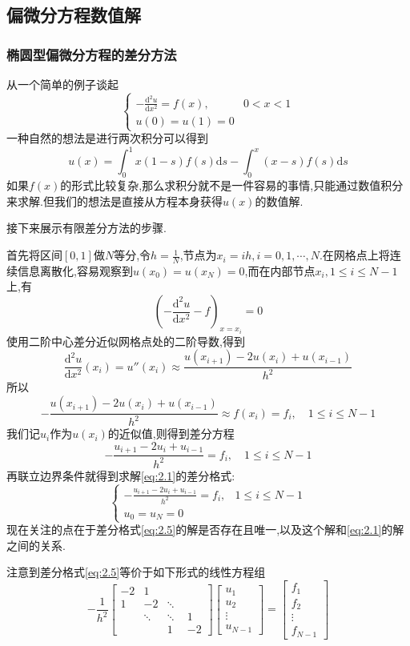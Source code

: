 \newpage
\subsection{偏微分方程数值解}
\subsubsection{椭圆型偏微分方程的差分方法}
从一个简单的例子谈起
\begin{equation}
    \begin{cases}
    -\frac{\mathrm{d}^2u}{\mathrm{d}x^2}=f(x),&0<x<1\\[3pt]
    u(0)=u(1)=0
\end{cases}
\label{eq:2.1}
\end{equation}
一种自然的想法是进行两次积分可以得到
$$
u(x)=\int_0^1x(1-s)f(s)\mathrm{d}s-\int_0^x (x-s)f(s)\mathrm{d}s
$$
如果$f(x)$的形式比较复杂,那么求积分就不是一件容易的事情,只能通过数值积分来求解.但我们的想法是直接从方程本身获得$u(x)$的数值解.\par
接下来展示有限差分方法的步骤.\par
首先将区间$[0,1]$做$N$等分,令$h=\frac{1}{N}$,节点为$x_i=ih,i=0,1,\cdots,N$.在网格点上将连续信息离散化,容易观察到$u(x_0)=u(x_N)=0$,而在内部节点$x_i,1\leqslant i\leqslant N-1$上,有
$$
\left(-\frac{\mathrm{d}^2u}{\mathrm{d}x^2}-f\right)_{x=x_i}=0
$$
使用二阶中心差分近似网格点处的二阶导数,得到
$$
\frac{\mathrm{d}^2u}{\mathrm{d}x^2}(x_i)=u''(x_i)\approx \frac{u(x_{i+1})-2u(x_i)+u(x_{i-1})}{h^2}
$$
所以
$$
-\frac{u(x_{i+1})-2u(x_i)+u(x_{i-1})}{h^2}\approx f(x_i)=f_i,\quad 1\leqslant i\leqslant N-1
$$
我们记$u_i$作为$u(x_i)$的近似值,则得到差分方程
$$
-\frac{u_{i+1}-2u_i+u_{i-1}}{h^2}=f_i,\quad 1\leqslant i\leqslant N-1
$$
再联立边界条件就得到求解\eqref{eq:2.1}的差分格式:
\begin{equation}
    \begin{cases}
    -\frac{u_{i+1}-2u_i+u_{i-1}}{h^2}=f_i,&1\leqslant i\leqslant N-1\\[3pt]
    u_0=u_N=0
\end{cases}
\label{eq:2.5}
\end{equation}
现在关注的点在于差分格式\eqref{eq:2.5}的解是否存在且唯一,以及这个解和\eqref{eq:2.1}的解之间的关系.\par
注意到差分格式\eqref{eq:2.5}等价于如下形式的线性方程组
$$
-\frac{1}{h^2}
\begin{bmatrix}
-2 & 1 & \quad & \quad\\
1 & -2 & \ddots & \quad\\
\quad & \ddots & \ddots & 1\\
\quad & \quad & 1 & -2
\end{bmatrix}
\begin{bmatrix}
u_1\\
u_2\\
\vdots\\
u_{N-1}
\end{bmatrix}
=
\begin{bmatrix}
f_1\\
f_2\\
\vdots\\
f_{N-1}
\end{bmatrix}
$$
